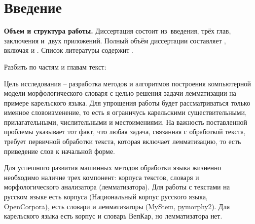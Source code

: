 \chapter*{Введение}                         %

\newcommand{\actuality}{}
\newcommand{\progress}{}
\newcommand{\aim}{{\textbf\aimTXT}}
\newcommand{\tasks}{\textbf{\tasksTXT}}
\newcommand{\novelty}{\textbf{\noveltyTXT}}
\newcommand{\influence}{\textbf{\influenceTXT}}
\newcommand{\methods}{\textbf{\methodsTXT}}
\newcommand{\defpositions}{\textbf{\defpositionsTXT}}
\newcommand{\reliability}{\textbf{\reliabilityTXT}}
\newcommand{\probation}{\textbf{\probationTXT}}
\newcommand{\contribution}{\textbf{\contributionTXT}}
\newcommand{\publications}{\textbf{\publicationsTXT}}


\textbf{Объем и структура работы.} Диссертация состоит из~введения, трёх глав,
заключения и~двух приложений.
%
Полный объём диссертации составляет
, включая
 и
.   Список литературы содержит
.

Разбить по частям и главам текст:

Цель исследования -- разработка методов и алгоритмов построения компьютерной модели морфологического словаря с целью решения задачи лемматизации на примере карельского языка. Для упрощения работы будет рассматриваться только именное словоизменение, то есть я ограничусь карельскими существительными, прилагательными, числительными и местоимениями.
На важность поставленной проблемы указывает тот факт, что любая задача, связанная с обработкой текста, требует первичной обработки текста, которая включает лемматизацию, то есть приведение слов к начальной форме.

Для успешного развития машинных методов обработки языка жизненно необходимо наличие трех компонент: корпуса текстов, словаря и морфологического анализатора (лемматизатора). Для работы с текстами на русском языке есть корпуса (Национальный корпус русского языка, OpenCorpora), есть словари и лемматизаторы (MyStem, pymorphy2). Для карельского языка есть корпус и словарь ВепКар, но лемматизатора нет.


